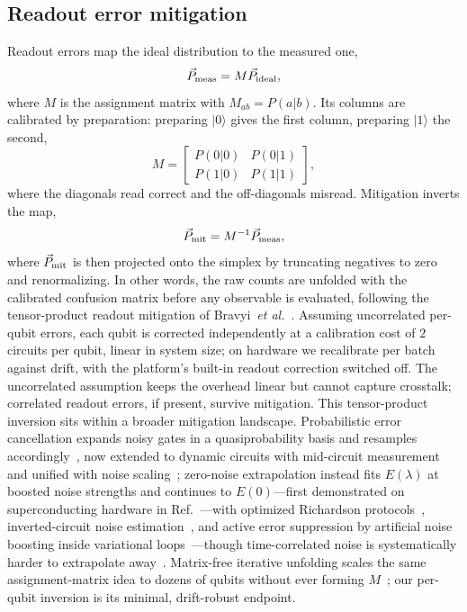 \subsection{Readout error mitigation}
\label{sec:readout}

Readout errors map the ideal distribution to the measured one,
\begin{equation}
\vec{P}_{\rm meas}=M\vec{P}_{\rm ideal},
\end{equation}
where $M$ is the assignment matrix with $M_{ab}=P(a|b)$.
Its columns are calibrated by preparation: preparing $|0\rangle$
gives the first column, preparing $|1\rangle$ the second,
\begin{equation}
M=\begin{bmatrix} P(0|0) & P(0|1) \\ P(1|0) & P(1|1) \end{bmatrix},
\end{equation}
where the diagonals read correct and the off-diagonals misread.
Mitigation inverts the map,
\begin{equation}
\vec{P}_{\rm mit}=M^{-1}\vec{P}_{\rm meas},
\end{equation}
where $\vec{P}_{\rm mit}$ is then projected onto the simplex by
truncating negatives to zero and renormalizing. In other words, the
raw counts are unfolded with the calibrated confusion matrix before any
observable is evaluated, following the tensor-product readout mitigation of
Bravyi~\textit{et al.}~\cite{bravyi2021mitigating}.
Assuming uncorrelated per-qubit errors, each qubit is corrected
independently at a calibration cost of $2$ circuits per qubit, linear in
system size; on hardware we recalibrate per batch against drift, with the
platform's built-in readout correction switched off.
The uncorrelated assumption keeps the overhead linear but cannot capture
crosstalk; correlated readout errors, if present, survive mitigation.
This tensor-product inversion sits within a broader mitigation
landscape. Probabilistic error cancellation expands noisy gates in a
quasiprobability basis and resamples
accordingly~\cite{temme2017error}, now extended to dynamic circuits with
mid-circuit measurement~\cite{gupta2024probabilistic} and unified with
noise scaling~\cite{mari2021extending}; zero-noise extrapolation instead
fits $E(\lambda)$ at boosted noise strengths and continues to
$E(0)$---first demonstrated on superconducting
hardware in Ref.~\cite{kandala2019error}---with optimized Richardson
protocols~\cite{krebsbach2022optimization}, inverted-circuit noise
estimation~\cite{koenig2024inverted}, and active error suppression by
artificial noise boosting inside variational
loops~\cite{li2017efficient}---though time-correlated noise is
systematically harder to extrapolate
away~\cite{schultz2022analyzing}. Matrix-free iterative unfolding scales
the same assignment-matrix idea to dozens of qubits without ever forming
$M$~\cite{nation2021scalable}; our per-qubit inversion is its minimal,
drift-robust endpoint.
